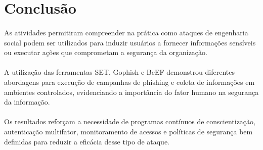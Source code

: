 \section{Conclusão}

\paragraph{}
As atividades permitiram compreender na prática como ataques de engenharia
social podem ser utilizados para induzir usuários a fornecer informações
sensíveis ou executar ações que comprometam a segurança da organização.

\paragraph{}
A utilização das ferramentas SET, Gophish e BeEF demonstrou diferentes
abordagens para execução de campanhas de phishing e coleta de informações em
ambientes controlados, evidenciando a importância do fator humano na segurança
da informação.

\paragraph{}
Os resultados reforçam a necessidade de programas contínuos de conscientização,
autenticação multifator, monitoramento de acessos e políticas de segurança bem
definidas para reduzir a eficácia desse tipo de ataque.
